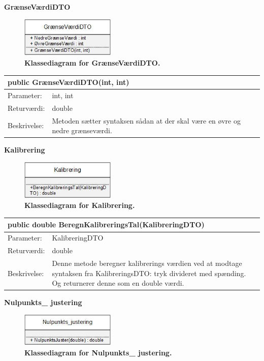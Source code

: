 \textbf{GrænseVærdiDTO}
\begin{figure}[H]
\includegraphics[width =0.4\textwidth , center]{billeder/klassediagramgransevardiDTO}
\caption{\textbf{Klassediagram for GrænseVærdiDTO.}}
\end{figure}
\begin{table}[H]
\label{tab:tabel2}
\begin{tabular}{| l | p{13cm} |}
   \hline
   \multicolumn{2}{|l|}{public GrænseVærdiDTO(int, int)} \\ \hline
   Parameter: & int, int\\ \hline
   Returværdi: & double \\ \hline
   Beskrivelse: & Metoden sætter syntaksen sådan at der skal være en øvre og nedre grænseværdi.\\ \hline
\end{tabular}
\end{table}
\textbf{Kalibrering}
\begin{figure}[H]
\includegraphics[width =0.4\textwidth , center]{billeder/klassediagramkalibrering}
\caption{\textbf{Klassediagram for Kalibrering.}}
\end{figure}
\begin{table}[H]
\label{tab:tabel2}
\begin{tabular}{| l | p{13cm} |}
   \hline
   \multicolumn{2}{|l|}{public double BeregnKalibreringsTal(KalibreringDTO)} \\ \hline
   Parameter: & KalibreringDTO\\ \hline
   Returværdi: & double \\ \hline
   Beskrivelse: & Denne metode beregner kalibrerings værdien ved at modtage syntaksen fra KalibreringsDTO: tryk divideret med spænding. Og returnerer denne som en double værdi.\\ \hline
\end{tabular}
\end{table}
\textbf{Nulpunkts\_ justering}
\begin{figure}[H]
\includegraphics[width =0.4\textwidth , center]{billeder/klassediagramnulpunkt}
\caption{\textbf{Klassediagram for Nulpunkts\_ justering.}}
\end{figure}
